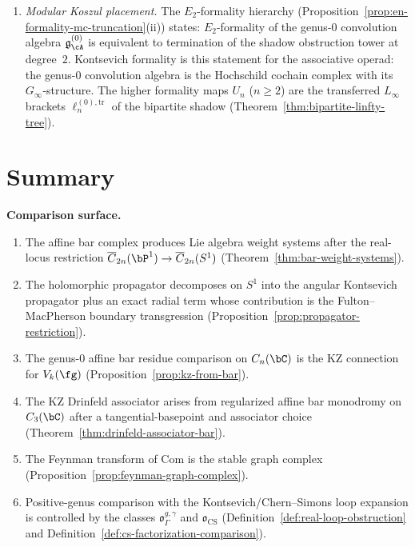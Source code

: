\begin{construction}
\begin{enumerate}[label=\textup{(\roman*)}]
\item \emph{Modular Koszul placement.}
 The $E_2$-formality hierarchy
 (Proposition~\ref{prop:en-formality-mc-truncation}\textup{(ii)})
 states: $E_2$-formality of the genus-$0$ convolution algebra
 $\mathfrak{g}^{(0)}_\cA$ is equivalent to termination of the shadow
 obstruction tower at degree~$2$. Kontsevich formality is this statement for
 the associative operad: the genus-$0$ convolution algebra is the Hochschild
 cochain complex with its $G_\infty$-structure. The higher formality maps
 $U_n$ ($n \geq 2$) are the transferred $L_\infty$ brackets
 $\ell_n^{(0),\mathrm{tr}}$ of the bipartite shadow
 (Theorem~\ref{thm:bipartite-linfty-tree}).
\end{enumerate}
\end{construction}

\section{Summary}
\label{sec:kontsevich-summary}

\noindent
\textbf{Comparison surface.}
\begin{enumerate}
\item The affine bar complex produces Lie algebra weight systems
 after the real-locus restriction
 $\overline{C}_{2n}(\bP^1)\to\overline{C}_{2n}(S^1)$
 (Theorem~\ref{thm:bar-weight-systems}).
\item The holomorphic propagator decomposes on $S^1$ into the
 angular Kontsevich propagator plus an exact radial term whose
 contribution is the Fulton--MacPherson boundary transgression
 (Proposition~\ref{prop:propagator-restriction}).
\item The genus-$0$ affine bar residue comparison on $C_n(\bC)$ is
 the KZ connection for $V_k(\fg)$
 (Proposition~\ref{prop:kz-from-bar}).
\item The KZ Drinfeld associator arises from regularized affine bar
 monodromy on $C_3(\bC)$ after a tangential-basepoint and associator
 choice (Theorem~\ref{thm:drinfeld-associator-bar}).
\item The Feynman transform of $\mathrm{Com}$ is the stable graph complex
 (Proposition~\ref{prop:feynman-graph-complex}).
\item Positive-genus comparison with the Kontsevich/Chern--Simons
 loop expansion is controlled by the classes
 $\mathfrak{o}^{g,\gamma}_\Gamma$ and
 $\mathfrak{o}_{\mathrm{CS}}$
 (Definition~\ref{def:real-loop-obstruction} and
 Definition~\ref{def:cs-factorization-comparison}).
\end{enumerate}
